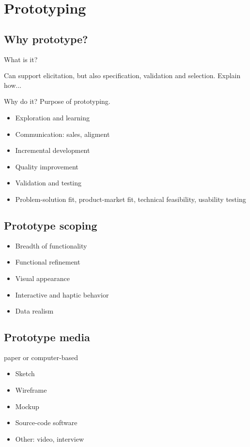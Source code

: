 \documentclass{reqengbook}
\begin{document}




\chapter{Prototyping}

\section{Why prototype?}

What is it?

Can support elicitation, but also specification, validation and selection. Explain how...

Why do it? Purpose of prototyping.

\begin{itemize}
  \item Exploration and learning
  \item Communication: sales, aligment
  \item Incremental development
  \item Quality improvement
  \item Validation and testing
  \item Problem-solution fit, product-market fit, technical feasibility, usability testing
\end{itemize}

\section{Prototype scoping}

\begin{itemize}
  \item Breadth of functionality
  \item Functional refinement
  \item Visual appearance
  \item Interactive and haptic behavior
  \item Data realism
\end{itemize}


\section{Prototype media}
paper or computer-based
\begin{itemize}
  \item Sketch 
  \item Wireframe
  \item Mockup
  \item Source-code software
  \item Other: video, interview
\end{itemize}
\end{document}
